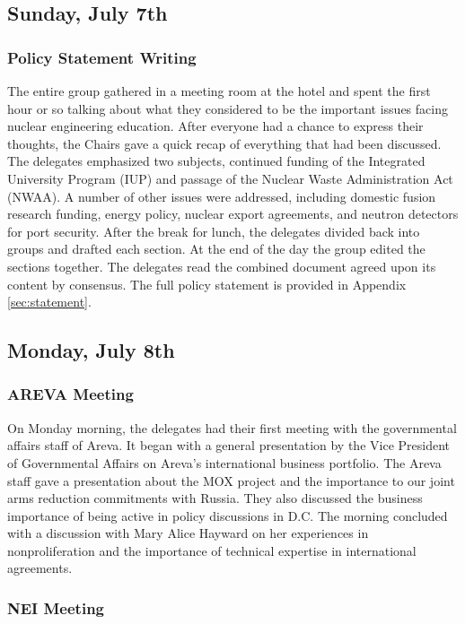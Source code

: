 
\subsection*{Sunday, July 7th}

\subsubsection*{Policy Statement Writing}

The entire group gathered in a meeting room at the hotel and spent the first
hour or so talking about what they considered to be the important issues facing
nuclear engineering education. After everyone had a chance to express their
thoughts, the Chairs gave a quick recap of everything that had been
discussed. The delegates emphasized two subjects, continued funding of the
Integrated University Program (IUP) and passage of the Nuclear Waste
Administration Act (NWAA). A number of other issues were addressed, including
domestic fusion research funding, energy policy, nuclear export agreements, and
neutron detectors for port security. After the break for lunch, the delegates
divided back into groups and drafted each section. At the end of the day the
group edited the sections together. The delegates read the combined document
agreed upon its content by consensus. The full policy statement is provided in
Appendix \ref{sec:statement}.

\subsection*{Monday, July 8th}

\subsubsection*{AREVA Meeting} 

On Monday morning, the delegates had their first meeting with the governmental
affairs staff of Areva. It began with a general presentation by the Vice
President of Governmental Affairs on Areva's international business
portfolio. The Areva staff gave a presentation about the MOX project and the
importance to our joint arms reduction commitments with Russia. They also
discussed the business importance of being active in policy discussions in
D.C. The morning concluded with a discussion with Mary Alice Hayward on her
experiences in nonproliferation and the importance of technical expertise in
international agreements.

\subsubsection*{NEI Meeting} 

